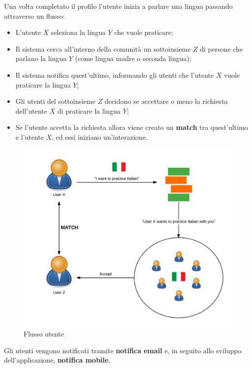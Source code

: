 Una volta completato il profilo l'utente inizia a parlare una lingua passando attraverso un flusso:

\begin{itemize}

\item L'utente $X$ seleziona la lingua $Y$ che vuole praticare;
\item Il sistema cerca all'interno della comunità un sottoinsieme $Z$ di persone che parlano la lingua $Y$ (come lingua madre o seconda lingua);
\item Il sistema notifica quest'ultimo, informando gli utenti che l'utente $X$ vuole praticare la lingua $Y$;
\item Gli utenti del sottoinsieme $Z$ decidono se accettare o meno la richiesta dell'utente $X$ di praticare la lingua $Y$;
\item Se l'utente accetta la richiesta allora viene creato un \textbf{match} tra quest'ultimo e l'utente $X$, ed essi iniziano un'interazione.

\end{itemize}

\begin{figure}[htpd]
\centering
\includegraphics[width=\textwidth/2]{../immagini/coffeestrap-flow}
\caption{Flusso utente}
\end{figure}

Gli utenti vengono notificati tramite \textbf{notifica email} e, in seguito allo sviluppo dell'applicazione, \textbf{notifica mobile}.

